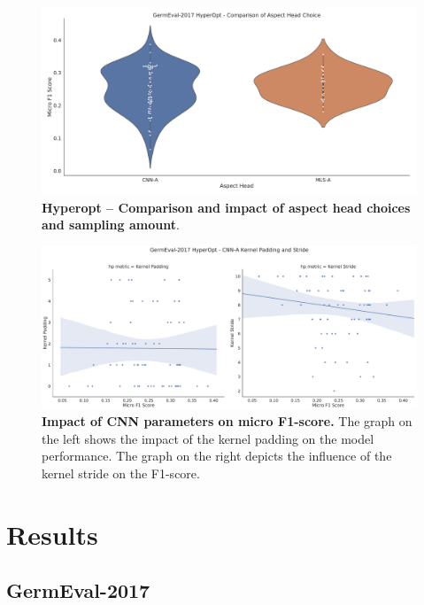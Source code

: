\begin{figure}[H]
	\centering
	\includegraphics[width=\textwidth]{figures/06_results/06_hp_ge_vio_aspectHead_test}
	\caption{\textbf{Hyperopt -- Comparison and impact of aspect head choices and sampling amount}.}
	\label{fig:06_ge_aspectHeadChoices}
\end{figure}

\begin{figure}[H]
	\centering
	\includegraphics[width=\textwidth]{figures/06_results/06_hp_ge_lm_cnnParams2_test}
	\caption{\textbf{Impact of CNN parameters on micro F1-score.} The graph on the left shows the impact of the kernel padding on the model performance. The graph on the right depicts the influence of the kernel stride on the F1-score.}
	\label{fig:06_HpOptim_CnnParams2}
\end{figure}

\section{Results}

\subsection{GermEval-2017}

